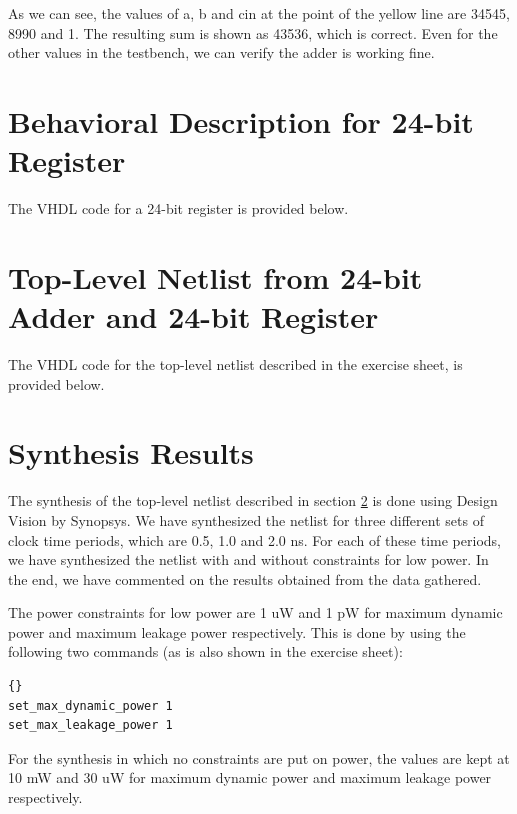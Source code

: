 \documentclass[11pt,a4paper]{article}
\begin{document}
As we can see, the values of a, b and cin at the point of the yellow line are 34545, 8990 and 1. The resulting sum is shown as 43536, which is correct. Even for the other values in the testbench, we can verify the adder is working fine.

\section{Behavioral Description for 24-bit Register}

The VHDL code for a 24-bit register is provided below.\\ 



\section{Top-Level Netlist from 24-bit Adder and 24-bit Register}
\label{sec:netlist}

The VHDL code for the top-level netlist described in the exercise sheet, is provided below.\\ 


\newpage
\section{Synthesis Results}

The synthesis of the top-level netlist described in section \ref{sec:netlist} is done using Design Vision by Synopsys. We have synthesized the netlist for three different sets of clock time periods, which are 0.5, 1.0 and 2.0 ns. For each of these time periods, we have synthesized the netlist with and without constraints for low power. In the end, we have commented on the results obtained from the data gathered.

The power constraints for low power are 1 uW and 1 pW for maximum dynamic power and maximum leakage power respectively. This is done by using the following two commands (as is also shown in the exercise sheet):\\

\begin{lstlisting}[frame=trbl]{}
set_max_dynamic_power 1
set_max_leakage_power 1
\end{lstlisting}
\vspace{0.5cm}
For the synthesis in which no constraints are put on power, the values are kept at 10 mW and 30 uW for maximum dynamic power and maximum leakage power respectively.\\
\end{document}
